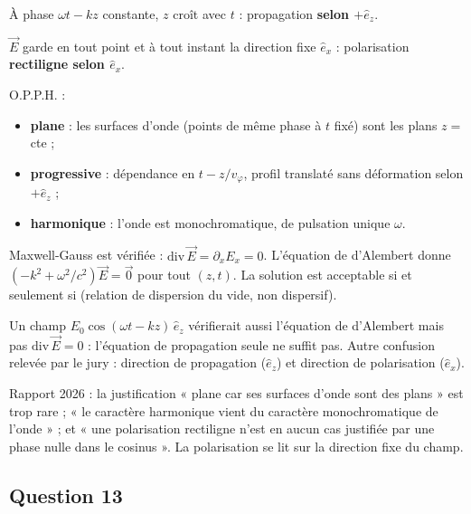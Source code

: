 \documentclass[11pt,a4paper]{article}
\providecommand{\tightlist}{\setlength{\itemsep}{0pt}\setlength{\parskip}{0pt}}
\newcommand{\equationajustee}[1]{%
  \sbox{\boiteequation}{$\displaystyle #1$}%
  \ifdim\wd\boiteequation>\linewidth
    \[\resizebox{\linewidth}{!}{\usebox{\boiteequation}}\]%
  \else
    \[#1\]%
  \fi}
\begin{document}
À phase \(\omega t-kz\) constante, \(z\) croît avec \(t\) : propagation \textbf{selon \(+\hat e_z\)}.

\(\vec E\) garde en tout point et à tout instant la direction fixe \(\hat e_x\) : polarisation \textbf{rectiligne selon \(\hat e_x\)}.

O.P.P.H. :

\begin{itemize}
\tightlist
\item
  \textbf{plane} : les surfaces d'onde (points de même phase à \(t\) fixé) sont les plans \(z=\) cte ;
\item
  \textbf{progressive} : dépendance en \(t-z/v_\varphi\), profil translaté sans déformation selon \(+\hat e_z\) ;
\item
  \textbf{harmonique} : l'onde est monochromatique, de pulsation unique \(\omega\).
\end{itemize}

Maxwell-Gauss est vérifiée : \(\mathrm{div}\,\vec E=\partial_xE_x=0\). L'équation de d'Alembert donne \((-k^2+\omega^2/c^2)\vec E=\vec 0\) pour tout \((z,t)\). La solution est acceptable si et seulement si
\equationajustee{\boxed{k=\frac{\omega}{c}}}
(relation de dispersion du vide, non dispersif).

\begin{piege}

Un champ \(E_0\cos(\omega t-kz)\,\hat e_z\) vérifierait aussi l'équation de d'Alembert mais pas \(\mathrm{div}\,\vec E=0\) : l'équation de propagation seule ne suffit pas. Autre confusion relevée par le jury : direction de propagation (\(\hat e_z\)) et direction de polarisation (\(\hat e_x\)).

\end{piege}

\begin{jury}

Rapport 2026 : la justification « plane car ses surfaces d'onde sont des plans » est trop rare ; « le caractère harmonique vient du caractère monochromatique de l'onde » ; et « une polarisation rectiligne n'est en aucun cas justifiée par une phase nulle dans le cosinus ». La polarisation se lit sur la direction fixe du champ.

\end{jury}

\hypertarget{question-13}{%
\subsection{Question 13}\label{question-13}}
\end{document}
